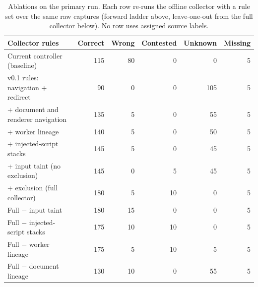 \begin{table}[tb]
\centering\small
\begin{tabular}{@{}lrrrrr@{}}
\toprule
Collector rules & Correct & Wrong & Contested & Unknown & Missing \\
\midrule
Current controller (baseline) & 115 & 80 & 0 & 0 & 5 \\
v0.1 rules: navigation + redirect & 90 & 0 & 0 & 105 & 5 \\
+ document and renderer navigation & 135 & 5 & 0 & 55 & 5 \\
+ worker lineage & 140 & 5 & 0 & 50 & 5 \\
+ injected-script stacks & 145 & 5 & 0 & 45 & 5 \\
+ input taint (no exclusion) & 145 & 0 & 5 & 45 & 5 \\
+ exclusion (full collector) & 180 & 5 & 10 & 0 & 5 \\
\midrule
Full $-$ input taint & 180 & 15 & 0 & 0 & 5 \\
Full $-$ injected-script stacks & 175 & 10 & 10 & 0 & 5 \\
Full $-$ worker lineage & 175 & 5 & 10 & 5 & 5 \\
Full $-$ document lineage & 130 & 10 & 0 & 55 & 5 \\
\bottomrule
\end{tabular}
\caption{Ablations on the primary run. Each row re-runs the offline collector with a rule set over the same raw captures (forward ladder above, leave-one-out from the full collector below). No row uses assigned source labels.}
\label{tab:ablation}
\end{table}
